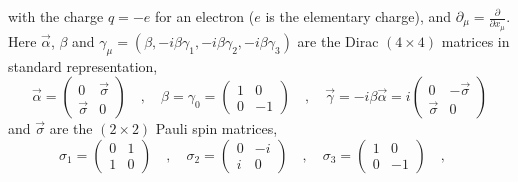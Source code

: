 \documentclass[12pt]{article}
\begin{document}
with the charge $q=-e$ for an electron ($e$ is the elementary charge), and $\partial_\mu=\frac{\partial}{\partial x_\mu}$. Here $\vec{\alpha}$, $\beta$ and $\gamma_\mu=(\beta,-i\beta\gamma_1,-i\beta\gamma_2,-i\beta\gamma_3)$ are the Dirac $(4\times 4)$ matrices in standard representation,
\begin{equation}
   \vec{\alpha} = \left( \begin{matrix} 0 & \vec{\sigma}  \\ \vec{\sigma} & 0  \end{matrix} \right) \quad,\quad
   \beta = \gamma_0 = \left( \begin{matrix} 1 & 0  \\ 0 & -1  \end{matrix} \right) \quad,\quad
   \vec{\gamma} = -i\beta\vec{\alpha} = i \left( \begin{matrix} 0 & -\vec{\sigma}  \\ \vec{\sigma} & 0  \end{matrix} \right)
   \label{DiracMatrix}
\end{equation}
and $\vec{\sigma}$ are the $(2\times 2)$ Pauli spin matrices,
\begin{equation}
   \sigma_1 = \left( \begin{matrix} 0 & 1  \\ 1 & 0  \end{matrix} \right) \quad,\quad
   \sigma_2 = \left( \begin{matrix} 0 & -i  \\ i & 0  \end{matrix} \right) \quad,\quad
   \sigma_3 = \left( \begin{matrix} 1 & 0  \\ 0 & -1  \end{matrix} \right) \quad,\quad
   \label{PaulMatrix}
\end{equation}
\end{document}
